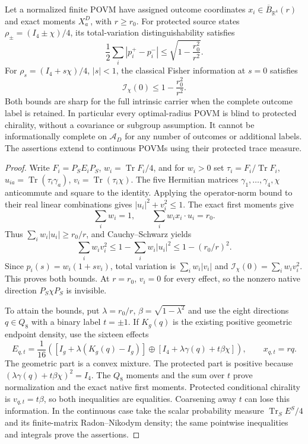\documentclass[12pt,a4paper]{article}
\begin{document}
\begin{theorem}
\label{p2c:thm:v226-chirality-radius}
Let a normalized finite POVM have assigned outcome coordinates
$x_i\in\overline B_{\mathbb R^4}(r)$ and exact moments $X_a^D$, with
$r\ge r_0$. For protected source states
$\rho_\pm=(I_4\pm\chi)/4$, its total-variation distinguishability satisfies
\[
 \boxed{\frac12\sum_i|p_i^+-p_i^-|
        \le\sqrt{1-\frac{r_0^2}{r^2}}.}
\]
For $\rho_s=(I_4+s\chi)/4$, $|s|<1$, the classical Fisher information
at $s=0$ satisfies
\[
 \boxed{\mathcal I_\chi(0)\le1-\frac{r_0^2}{r^2}.}
\]
Both bounds are sharp for the full intrinsic carrier when the complete
outcome label is retained. In particular every optimal-radius POVM is blind
to protected chirality, without a covariance or subgroup assumption.
It cannot be informationally complete on $\mathcal A_D$ for any number
of outcomes or additional labels. The assertions extend to continuous POVMs
using their protected trace measure.
\end{theorem}
\begin{proof}
Write $F_i=P_SE_iP_S$, $w_i=\operatorname{Tr}F_i/4$, and for $w_i>0$ set
$\tau_i=F_i/\operatorname{Tr}F_i$,
$u_{ia}=\operatorname{Tr}(\tau_i\gamma_a)$,
$v_i=\operatorname{Tr}(\tau_i\chi)$.
The five Hermitian matrices $\gamma_1,\ldots,\gamma_4,\chi$ anticommute and
square to the identity. Applying the operator-norm bound to their real
linear combinations gives $|u_i|^2+v_i^2\le1$.
The exact first moments give
\[
 \sum_iw_i=1,\qquad
 \sum_iw_i x_i\cdot u_i=r_0.
\]
Thus $\sum_iw_i|u_i|\ge r_0/r$, and Cauchy--Schwarz yields
\[
 \sum_iw_iv_i^2\le1-\sum_iw_i|u_i|^2
                      \le1-(r_0/r)^2.
\]
Since $p_i(s)=w_i(1+sv_i)$, total variation is
$\sum_iw_i|v_i|$ and $\mathcal I_\chi(0)=\sum_iw_iv_i^2$.
This proves both bounds. At $r=r_0$, $v_i=0$ for every effect, so the
nonzero native direction $P_S\chi P_S$ is invisible.

To attain the bounds, put $\lambda=r_0/r$,
$\beta=\sqrt{1-\lambda^2}$ and use the eight directions $q\in Q_8$ with
a binary label $t=\pm1$. If $K_g(q)$ is the existing positive geometric
endpoint density, use the sixteen effects
\[
 E_{q,t}=\frac1{16}\left(
 [I_g+\lambda(K_g(q)-I_g)]\oplus
 [I_4+\lambda\gamma(q)+t\beta\chi]\right),
 \qquad x_{q,t}=rq.
\]
The geometric part is a convex mixture. The protected part is positive
because $(\lambda\gamma(q)+t\beta\chi)^2=I_4$.
The $Q_8$ moments and the sum over $t$ prove normalization and the exact
native first moments. Protected conditional chirality is $v_{q,t}=t\beta$,
so both inequalities are equalities. Coarsening away $t$ can lose this
information. In the continuous case take the scalar probability measure
$\operatorname{Tr}_S E^S/4$ and its finite-matrix Radon--Nikodym density;
the same pointwise inequalities and integrals prove the assertions.
\end{proof}
\end{document}
